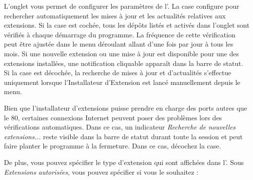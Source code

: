 L'onglet  vous permet de configurer les paramètres de 
l'. La case  configure \qg pour rechercher automatiquement les mises à 
jour et les actualités relatives aux extensions. Si la case est cochée, tous 
les dépôts listés et activés dans l'onglet  sont vérifiés à chaque 
démarrage du programme. La fréquence de cette vérification peut être ajustée 
dans le menu déroulant allant d'une fois par jour à tous les mois. Si une 
nouvelle extension ou une mise à jour est disponible pour une des extensions 
installées, une notification cliquable apparaît dans la barre de statut. Si 
la case est décochée, la recherche de mises à jour et d'actualités s'effectue 
uniquement lorsque l'Installateur d'Extension est lancé manuellement depuis 
le menu.

Bien que l'installateur d'extensions puisse prendre en charge des ports autres 
que le 80, certaines connexions Internet peuvent poser des problèmes lors des 
vérifications automatiques. Dans ce cas, un indicateur \textit{Recherche de 
nouvelles extensions...} reste visible dans la barre de statut durant toute 
la session \qg et peut faire planter le programme à la fermeture. Dans ce cas, 
décochez la case.

De plus, vous pouvez spécifier le type d'extension qui sont affichées dans 
l'. Sous \textit{Extensions autorisées}, 
vous pouvez spécifier si vous le souhaitez :

